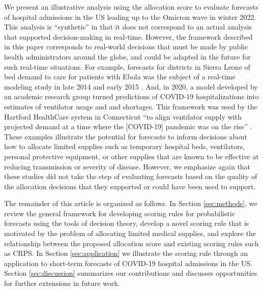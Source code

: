 \documentclass{article}
\begin{document}
We present an illustrative analysis using the allocation score to evaluate forecasts of hospital admissions in the US leading up to the Omicron wave in winter 2022.
This analysis is ``synthetic'' in that it does not correspond to an actual analysis that supported decision-making in real-time.
However, the framework described in this paper corresponds to real-world decisions that must be made by public health administrators around the globe, and could be adapted in the future for such real-time situations.
For example, forecasts for districts in Sierra Leone of bed demand to care for patients with Ebola was the subject of a real-time modeling study in late 2014 and early 2015 \citep{camacho2015-ebola-bed}.
And, in 2020, a model developed by an academic research group turned predictions of COVID-19 hospitalizations into estimates of ventilator usage and and shortages. This framework was used by the Hartford HealthCare system in Connecticut ``to align ventilator supply with projected demand at a time where the [COVID-19] pandemic was on the rise'' \citep{bertsimas2021predictionsCOVID}.
These examples illustrate the potential for forecasts to inform decisions about how to allocate limited supplies such as temporary hospital beds, ventilators, personal protective equipment, or other supplies that are known to be effective at reducing transmission or severity of disease.
However, we emphasize again that these studies did not take the step of evaluating forecasts based on the quality of the allocation decisions that they supported or could have been used to support.



The remainder of this article is organized as follows. 
In Section \ref{sec:methods}, we review the general framework for developing scoring rules for probabilistic forecasts using the tools of decision theory, develop a novel scoring rule that is motivated by the problem of allocating limited medical supplies, and explore the relationship between the proposed allocation score and existing scoring rules such as CRPS. 
In Section \ref{sec:application} we illustrate the scoring rule through an application to short-term forecasts of COVID-19 hospital admissions in the US. 
Section \ref{sec:discussion} summarizes our contributions and discusses opportunities for further extensions in future work.
\end{document}
